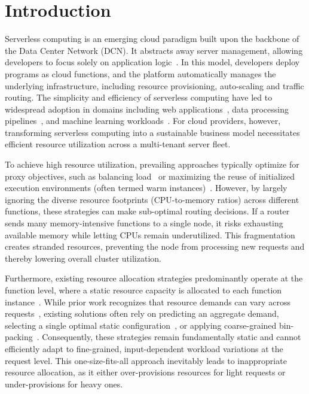 \vspace{-8pt}
\section{Introduction}
\label{sec:introduction}

Serverless computing is an emerging cloud paradigm built upon the backbone of the Data Center Network (DCN). It abstracts away server management, allowing developers to focus solely on application logic~\cite{CACM19:Rise, TR19:Berkeley, CACM21:Serverless}. In this model, developers deploy programs as cloud functions, and the platform automatically manages the underlying infrastructure, including resource provisioning, auto-scaling and traffic routing. The simplicity and efficiency of serverless computing have led to widespread adoption in domains including web applications~\cite{Doc:AzureWebApp}, data processing pipelines~\cite{pu2019shuffling, OSDI18:Pocket}, and machine learning workloads~\cite{SC20:Batch, OSDI21:Dorylus}. For cloud providers, however, transforming serverless computing into a sustainable business model necessitates efficient resource utilization across a multi-tenant server fleet.

To achieve high resource utilization, prevailing approaches typically optimize for proxy objectives, such as balancing load~\cite{SoCC22:Hermod, Doc:Knative, Doc:OpenFaaS} or maximizing the reuse of initialized execution environments (often termed warm instances)~\cite{FaaSCache, ASPLOS24:RainbowCake, RoyPT22, ShahradFGCBCLTR20, SoCC22:Hermod, Doc:OpenWhisk}.
However, by largely ignoring the diverse resource footprints (\eg CPU-to-memory ratios) across different functions, these strategies can make sub-optimal routing decisions. If a router sends many memory-intensive functions to a single node, it risks exhausting available memory while letting CPUs remain underutilized. This fragmentation creates stranded resources, preventing the node from processing new requests and thereby lowering overall cluster utilization.

Furthermore, existing resource allocation strategies predominantly operate at the function level, where a static resource capacity is allocated to each function instance~\cite{Doc:AWS_Lambda_Mem, Doc:Azure_Functions_Hosting, Doc:GCP_CloudRun_Mem, FaaSCache, JinZXZHLJ23, zhang2024jolteon, ZhangTKCS21, ORION_MahgoubYSECB22, AQUATOPE_ZhouZD23}. While prior work recognizes that resource demands can vary across requests~\cite{CherryPick, Selecta, OPTIMUSCLOUD, ORION_MahgoubYSECB22, aws_lambda_power_tuning}, existing solutions often rely on predicting an aggregate demand, selecting a single optimal static configuration~\cite{CherryPick, Selecta, OPTIMUSCLOUD}, or applying coarse-grained bin-packing~\cite{ORION_MahgoubYSECB22}. Consequently, these strategies remain fundamentally static and cannot efficiently adapt to fine-grained, input-dependent workload variations at the request level. This one-size-fits-all approach inevitably leads to inappropriate resource allocation, as it either over-provisions resources for light requests or under-provisions for heavy ones.

